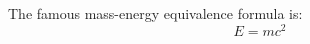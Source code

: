 \documentclass{article}
\begin{document}
The famous mass-energy equivalence formula is:
\[
E = mc^2
\]
\end{document}
